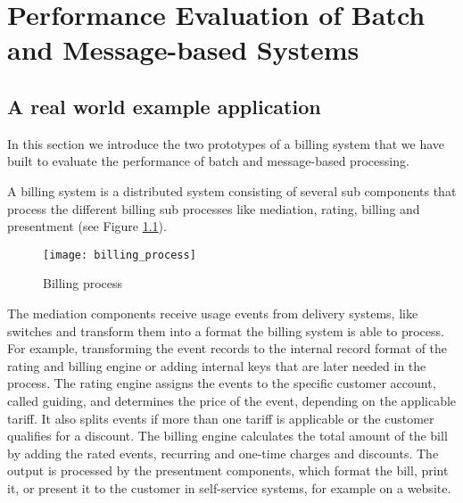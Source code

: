 \chapter{Performance Evaluation of Batch and Message-based Systems}\label{ch:performance_evaluation}

\section{A real world example  application}\label{sec:billing_application}
In this section we introduce the two prototypes of a billing system that we have built to evaluate the performance of batch and message-based processing.

A billing system is a distributed system consisting of several sub components that process the different billing sub processes like mediation, rating, billing and presentment (see Figure \ref{fig:billing_process}).

\begin{figure}[h!]
	\centering
	\texttt{[image: billing\_process]}
	\caption{Billing process}
	\label{fig:billing_process}
\end{figure}

The mediation components receive usage events from delivery systems, like switches and transform them into a format the billing system is able to process. For example, transforming the event records to the internal record format of the rating and billing engine or adding internal keys that are later needed in the process. The rating engine assigns the events to the specific customer account, called guiding, and determines the price of the event, depending on the applicable tariff. It also splits events if more than one tariff is applicable or the customer qualifies for a discount. The billing engine calculates the total amount of the bill by adding the rated events, recurring and one-time charges and discounts. The output is processed by the presentment components, which format the bill, print it, or present it to the customer in self-service systems, for example on a website.

